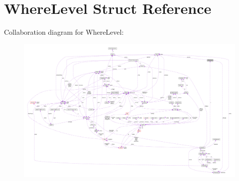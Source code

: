 \hypertarget{structWhereLevel}{}\section{Where\+Level Struct Reference}
\label{structWhereLevel}


Collaboration diagram for Where\+Level\+:\nopagebreak
\begin{figure}[H]
\begin{center}
\leavevmode
\includegraphics[width=350pt]{structWhereLevel__coll__graph}
\end{center}
\end{figure}
